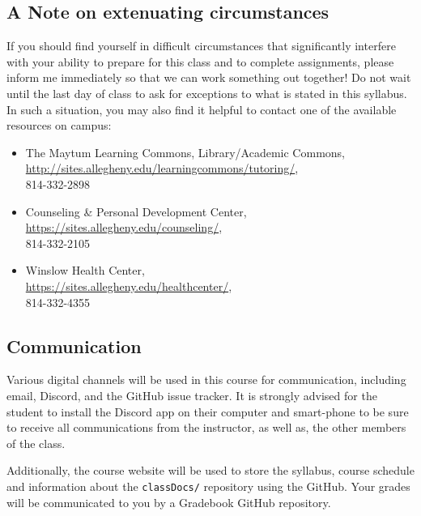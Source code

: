 \documentclass[11pt]{article} %
\begin{document}
\vspace{-.10in}
\subsection*{\textbf{A Note on extenuating circumstances}}

If you should find yourself in difficult circumstances that significantly interfere with your ability to prepare for this class and to complete assignments, please inform me immediately so that we can work something out together! Do not wait until the last day of class to ask for exceptions to what is stated in this syllabus. In such a situation, you may also find it helpful to contact one of the available resources on campus: 
\begin{itemize}
	\item The Maytum Learning Commons, Library/Academic Commons,\\ \url{http://sites.allegheny.edu/learningcommons/tutoring/},\\ 814-332-2898

	\item Counseling \& Personal Development Center,\\ \url{https://sites.allegheny.edu/counseling/},\\ 814-332-2105
	\item Winslow Health Center,\\ \url{https://sites.allegheny.edu/healthcenter/},\\ 814-332-4355
\end{itemize}

\subsection*{\textbf{Communication}}
Various digital channels will be used in this course for communication, including email,
Discord, and the GitHub issue tracker. It is strongly advised for the student to install the Discord app on their computer and smart-phone to be sure to receive all communications from the instructor, as well as, the other members of the class.

Additionally, the course website will be used to store the syllabus, course schedule and information about the {\tt classDocs/} repository using the GitHub.  Your grades will be communicated to you by a Gradebook GitHub repository. 
\end{document}
